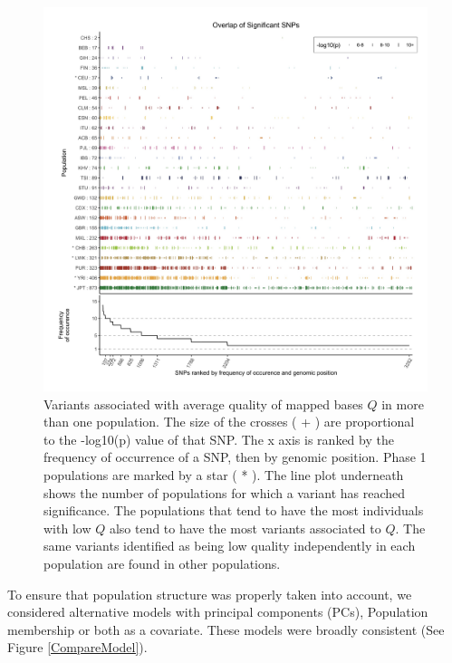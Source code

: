 \documentclass[9pt,lineno]{elife}
\begin{document}
\begin{figure}
\includegraphics[width=\hsize,keepaspectratio]{./Figures/SNPOverlap6.jpg}

\caption{Variants associated with average quality of mapped bases $Q$ in more than one population.
The size of the crosses ( + ) are proportional to the -log10(p) value of that SNP.
The x axis is ranked by the frequency of occurrence of a SNP, then by genomic position.
Phase 1 populations are marked by a star ( * ).
The line plot underneath shows the number of populations for which a variant has reached significance.
The populations that tend to have the most individuals with low $Q$ also tend to have the most variants associated to $Q$. 
The same variants identified as being low quality independently in each population are found in other populations. }
  \label{OverLap}
\end{figure}
To ensure that population structure was properly taken into account, we considered alternative models with principal components (PCs), Population membership or both as a covariate. These models were broadly consistent (See Figure \ref{CompareModel}).

\end{document}
